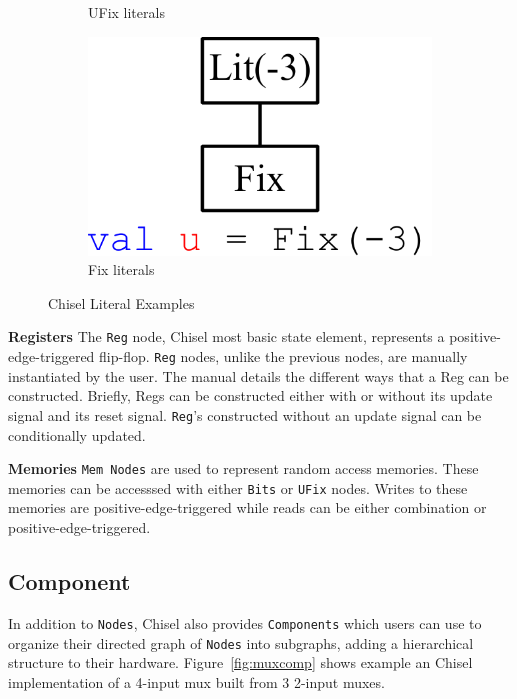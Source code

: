 \begin{figure}[b]
\begin{subfigure}[t]{0.22\textwidth}
  \caption{UFix literals}
  \label{fig:ufix}
  \end{subfigure}
  \hfill
  \begin{subfigure}[t]{0.22\textwidth}
  \centering
  \includegraphics[width=\textwidth]{figures/fix.pdf}
  \caption{Fix literals}
  \label{fig:fix}
  \end{subfigure}
\caption{Chisel Literal Examples}
\label{fig:lits}
\end{figure}

{\bf Registers} The {\tt Reg} node, Chisel most basic state element,
represents a positive-edge-triggered flip-flop. {\tt Reg} nodes, unlike the
previous nodes, are manually instantiated by the user. The manual
details the different ways that a Reg can be constructed. Briefly,
Regs can be constructed either with or without its update signal and
its reset signal. {\tt Reg}'s constructed without an update signal can
be conditionally updated.

{\bf Memories} {\tt Mem Nodes} are used to represent random access
memories. These memories can be accesssed with either {\tt Bits} or
{\tt UFix} nodes. Writes to these memories are positive-edge-triggered while
reads can be either combination or positive-edge-triggered.

\subsection{Component}
In addition to {\tt Nodes}, Chisel also provides {\tt Components} which users can
use to organize their directed graph of {\tt Nodes} into subgraphs, adding a
hierarchical structure to their hardware. Figure~\ref{fig:muxcomp} shows
example an Chisel implementation of a 4-input mux built from 3 2-input muxes.

